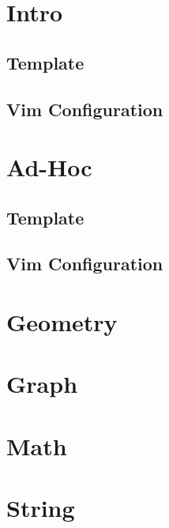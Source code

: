 \documentclass[a4paper,12pt]{article}
\newcommand\addS[4]{
  \subsection{#2}
  
}
\begin{document}
\tableofcontents
\thispagestyle{fancy}
\newpage

\begin{multicols}{2}

\section{Intro}
\addS{c++}{Template}{config}{template.cpp}
\addS{c++}{Vim Configuration}{config}{vim}

\section{Ad-Hoc}
\addS{c++}{Template}{config}{template.cpp}
\addS{c++}{Vim Configuration}{config}{vim}

\section{Geometry}

\section{Graph}

\section{Math}

\section{String}

\end{multicols}
\end{document}
